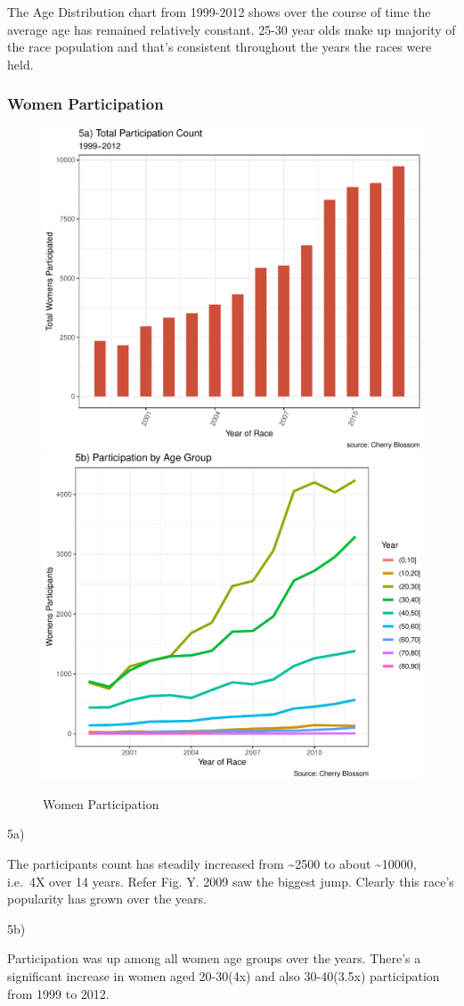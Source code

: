 \documentclass[
]{article}
\begin{document}
The Age Distribution chart from 1999-2012 shows over the course of time
the average age has remained relatively constant. 25-30 year olds make
up majority of the race population and that's consistent throughout the
years the races were held.

\hypertarget{women-participation}{%
\subsubsection{Women Participation}\label{women-participation}}

\begin{figure}[H]

\includegraphics[width=.49\linewidth,]{case_study02_files/figure-latex/unnamed-chunk-13-1} \includegraphics[width=.49\linewidth,]{case_study02_files/figure-latex/unnamed-chunk-13-2} \hfill{}

\caption{Women Participation}\label{fig:unnamed-chunk-13}
\end{figure}

\hfill\break
\hfill\break
5a)

The participants count has steadily increased from \textasciitilde2500
to about \textasciitilde10000, i.e.~4X over 14 years. Refer Fig. Y. 2009
saw the biggest jump. Clearly this race's popularity has grown over the
years.

5b)

Participation was up among all women age groups over the years. There's
a significant increase in women aged 20-30(4x) and also 30-40(3.5x)
participation from 1999 to 2012.
\end{document}
